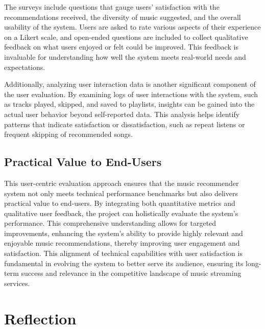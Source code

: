 \documentclass[10pt,twocolumn]{article}
\begin{document}
The surveys include questions that gauge users' satisfaction with the recommendations received, the diversity of music suggested, and the overall usability of the system. Users are asked to rate various aspects of their experience on a Likert scale, and open-ended questions are included to collect qualitative feedback on what users enjoyed or felt could be improved. This feedback is invaluable for understanding how well the system meets real-world needs and expectations.

Additionally, analyzing user interaction data is another significant component of the user evaluation. By examining logs of user interactions with the system, such as tracks played, skipped, and saved to playlists, insights can be gained into the actual user behavior beyond self-reported data. This analysis helps identify patterns that indicate satisfaction or dissatisfaction, such as repeat listens or frequent skipping of recommended songs.

\subsection{Practical Value to End-Users}

This user-centric evaluation approach ensures that the music recommender system not only meets technical performance benchmarks but also delivers practical value to end-users. By integrating both quantitative metrics and qualitative user feedback, the project can holistically evaluate the system's performance. This comprehensive understanding allows for targeted improvements, enhancing the system's ability to provide highly relevant and enjoyable music recommendations, thereby improving user engagement and satisfaction. This alignment of technical capabilities with user satisfaction is fundamental in evolving the system to better serve its audience, ensuring its long-term success and relevance in the competitive landscape of music streaming services.



\section{Reflection}
\end{document}
